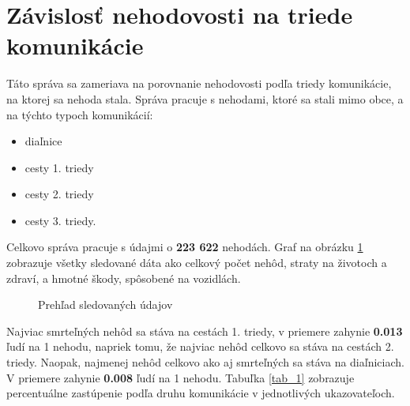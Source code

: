 \documentclass[a4paper, 11pt]{article}
\begin{document}
\section*{Závislosť nehodovosti na triede komunikácie}

Táto správa sa zameriava na porovnanie nehodovosti podľa triedy komunikácie, na ktorej sa nehoda stala. Správa pracuje s nehodami, ktoré sa stali mimo obce, a na týchto typoch komunikácií:

\begin{itemize}
	\item diaľnice
	\item cesty 1. triedy
	\item cesty 2. triedy
	\item cesty 3. triedy.
\end{itemize}

Celkovo správa pracuje s údajmi o \textbf{223 622} nehodách. Graf na obrázku \ref{obr_1} zobrazuje všetky sledované dáta ako celkový počet nehôd, straty na životoch a zdraví, a hmotné škody, spôsobené na vozidlách.

\begin{figure}[h]
	\centering
	\caption{Prehľad sledovaných údajov}
	\label{obr_1}
\end{figure}

Najviac smrteľných nehôd sa stáva na cestách 1. triedy, v priemere zahynie \textbf{0.013} ľudí na 1 nehodu, napriek tomu, že najviac nehôd celkovo sa stáva na cestách 2. triedy. Naopak, najmenej nehôd celkovo ako aj smrteľných sa stáva na diaľniciach. V priemere zahynie \textbf{0.008} ľudí na 1 nehodu. Tabuľka \ref{tab_1} zobrazuje percentuálne zastúpenie podľa druhu komunikácie v jednotlivých ukazovateľoch.
\end{document}
